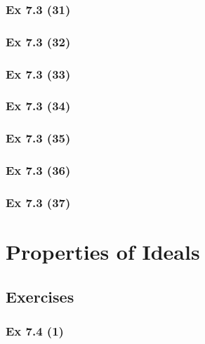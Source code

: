 \newpage		%


\subsubsection{Ex 7.3 (31)}\label{sec:Ex_7.3.31}

\subsubsection{Ex 7.3 (32)}\label{sec:Ex_7.3.32}

\subsubsection{Ex 7.3 (33)}\label{sec:Ex_7.3.33}

\subsubsection{Ex 7.3 (34)}\label{sec:Ex_7.3.34}

\subsubsection{Ex 7.3 (35)}\label{sec:Ex_7.3.35}

\subsubsection{Ex 7.3 (36)}\label{sec:Ex_7.3.36}

\subsubsection{Ex 7.3 (37)}\label{sec:Ex_7.3.37}

\newpage		%

\section{Properties of Ideals}\label{sec:7.4}	
\subsection*{Exercises}\label{sec:7.4_Exercises}

\subsubsection{Ex 7.4 (1)}\label{sec:Ex_7.4.1}

